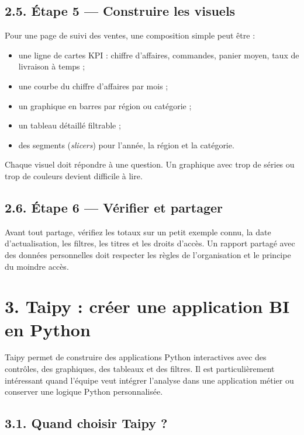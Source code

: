 \documentclass[
  french,
  letterpaper,
  open=any]{scrbook}
\providecommand{\tightlist}{%
  \setlength{\itemsep}{0pt}\setlength{\parskip}{0pt}}
\theoremstyle{definition}
\theoremstyle{definition}
\theoremstyle{remark}
\begin{document}
\subsection{2.5. Étape 5 --- Construire les
visuels}\label{uxe9tape-5-construire-les-visuels}

Pour une page de suivi des ventes, une composition simple peut être :

\begin{itemize}
\tightlist
\item
  une ligne de cartes KPI : chiffre d'affaires, commandes, panier moyen,
  taux de livraison à temps ;
\item
  une courbe du chiffre d'affaires par mois ;
\item
  un graphique en barres par région ou catégorie ;
\item
  un tableau détaillé filtrable ;
\item
  des segments (\emph{slicers}) pour l'année, la région et la catégorie.
\end{itemize}

Chaque visuel doit répondre à une question. Un graphique avec trop de
séries ou trop de couleurs devient difficile à lire.

\subsection{2.6. Étape 6 --- Vérifier et
partager}\label{uxe9tape-6-vuxe9rifier-et-partager}

Avant tout partage, vérifiez les totaux sur un petit exemple connu, la
date d'actualisation, les filtres, les titres et les droits d'accès. Un
rapport partagé avec des données personnelles doit respecter les règles
de l'organisation et le principe du moindre accès.

\section{3. Taipy : créer une application BI en
Python}\label{taipy-cruxe9er-une-application-bi-en-python}

Taipy permet de construire des applications Python interactives avec des
contrôles, des graphiques, des tableaux et des filtres. Il est
particulièrement intéressant quand l'équipe veut intégrer l'analyse dans
une application métier ou conserver une logique Python personnalisée.

\subsection{3.1. Quand choisir Taipy ?}\label{quand-choisir-taipy}
\end{document}
